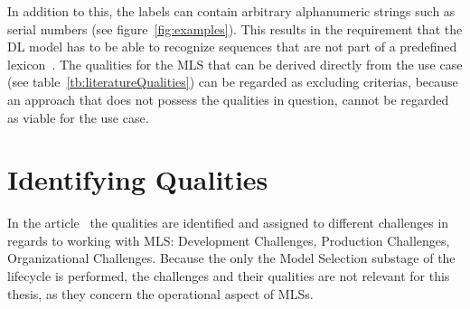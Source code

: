 In addition to this, the labels can contain arbitrary alphanumeric strings such as serial numbers
(see figure~\ref{fig:examples}).
This results in the requirement that the \ac{DL} model has to be able to recognize sequences that
are not part of a predefined lexicon~\citep{ghosh_visual_2017}.
The qualities for the \ac{MLS} that can be derived directly from the use case (see
table~\ref{tb:literatureQualities}) can be regarded as excluding criterias, because an approach
that does not possess the qualities in question, cannot be regarded as viable for the use case.

\section{Identifying Qualities}
In the article~\cite{ashmore_assuring_2021} the qualities are identified and assigned to different
challenges in regards to working with \ac{MLS}: Development Challenges, Production Challenges,
Organizational Challenges.
Because the only the Model Selection substage of the lifecycle is performed, the challenges and their
qualities are not relevant for this thesis, as they concern the operational aspect of \acp{MLS}.


